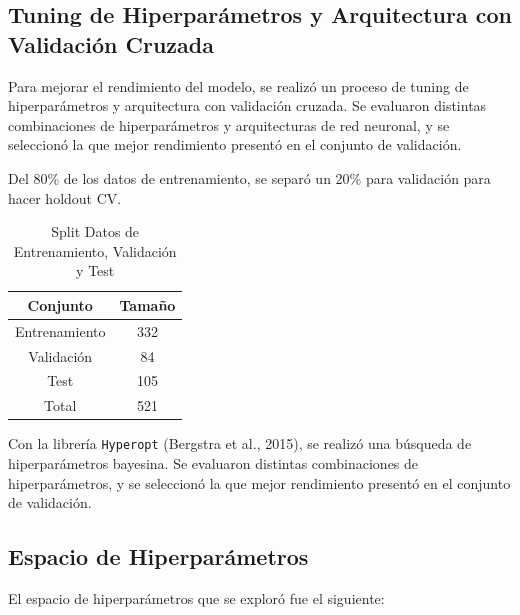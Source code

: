 \documentclass[
  a4paper,
]{article}
\begin{document}
\hypertarget{tuning-de-hiperparuxe1metros-y-arquitectura-con-validaciuxf3n-cruzada}{%
\subsection{Tuning de Hiperparámetros y Arquitectura con Validación
Cruzada}\label{tuning-de-hiperparuxe1metros-y-arquitectura-con-validaciuxf3n-cruzada}}

Para mejorar el rendimiento del modelo, se realizó un proceso de tuning
de hiperparámetros y arquitectura con validación cruzada. Se evaluaron
distintas combinaciones de hiperparámetros y arquitecturas de red
neuronal, y se seleccionó la que mejor rendimiento presentó en el
conjunto de validación.

Del 80\% de los datos de entrenamiento, se separó un 20\% para
validación para hacer holdout CV.

\begin{table}
\caption{Split Datos de Entrenamiento, Validación y Test}
\begin{center}
\begin{tabular}{|c|c|}
\hline
\textbf{Conjunto} & \textbf{Tamaño} \\
\hline
Entrenamiento & 332 \\
Validación & 84 \\
Test & 105 \\
Total & 521 \\
\hline
\end{tabular}
\end{center}
\end{table}

Con la librería \texttt{Hyperopt} (Bergstra et al., 2015), se realizó
una búsqueda de hiperparámetros bayesina. Se evaluaron distintas
combinaciones de hiperparámetros, y se seleccionó la que mejor
rendimiento presentó en el conjunto de validación.

\subsection{Espacio de Hiperparámetros}

El espacio de hiperparámetros que se exploró fue el siguiente:
\end{document}

